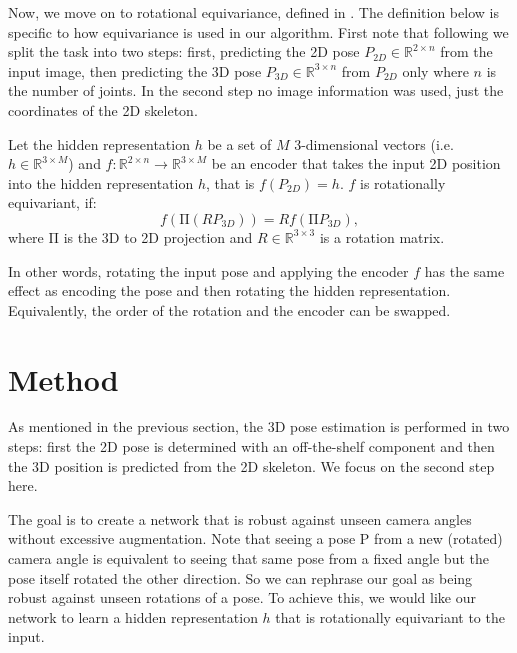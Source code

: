 \documentclass[preprint]{elsarticle}
\begin{document}
Now, we move on to rotational equivariance, defined in \cite{helge_geometry-aware}. The definition  below is specific to how equivariance is used in our algorithm. First note that following \cite{3dbaseline} we split the task into two steps: first, predicting the 2D pose $P_{2D}\in\mathbb{R}^{2\times n}$ from the input image, then predicting the 3D pose $P_{3D}\in\mathbb{R}^{3\times n}$ from $P_{2D}$ only where $n$ is the number of joints. In the second step no image information was used, just the coordinates of the 2D skeleton.

\begin{definition} 
Let the hidden representation $h$ be a set of $M$ 3-dimensional vectors (i.e. $h\in\mathbb{R}^{3\times M}$) and $f:\mathbb{R}^{2\times n}\rightarrow\mathbb{R}^{3\times M}$ be an encoder that takes the input 2D position into the hidden representation $h$, that is $f(P_{2D})=h$. $f$ is rotationally equivariant, if:
\begin{equation} \label{eq:equiv}
    f(\mathrm{\Pi} \left(RP_{3D}\right))=Rf(\mathrm{\Pi} P_{3D}),
\end{equation}
where $\mathrm{\Pi}$ is the 3D to 2D projection and $R\in\mathbb{R}^{3\times3}$ is a rotation matrix.
\end{definition}

In other words, rotating the input pose and applying the encoder $f$ has the same effect as encoding the pose and then rotating the hidden representation. Equivalently, the order of the rotation and the encoder can be swapped. 

\section{Method}
As mentioned in the previous section, the 3D pose estimation is performed in two steps: first the 2D pose is determined with an off-the-shelf component and then the 3D position is predicted from the 2D skeleton. We focus on the second step here.

The goal is to create a network that is robust against unseen camera angles without excessive augmentation. Note that seeing a pose P from a new (rotated) camera angle is equivalent to seeing that same pose from a fixed angle but the pose itself rotated the other direction. So we can rephrase our goal as being robust against unseen rotations of a pose. To achieve this, we would like our network to learn a hidden representation $h$ that is rotationally equivariant to the input.
\end{document}

